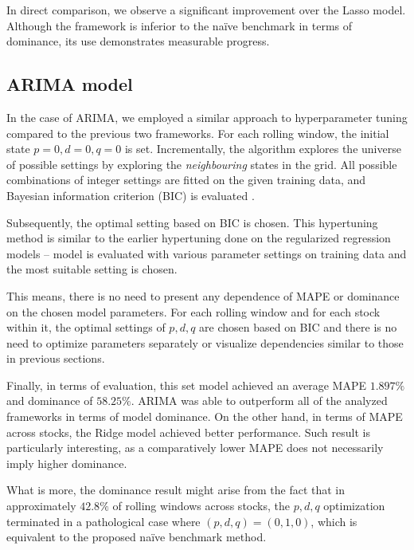 \documentclass{svk_en}
\begin{document}
In direct comparison, we observe a significant improvement over the Lasso model. Although the
framework is inferior to the naïve benchmark in terms of dominance, its use demonstrates measurable progress.

\subsection{ARIMA model}
In the case of ARIMA, we employed a similar approach to hyperparameter tuning compared to the previous two frameworks.
For each rolling window, the initial state $p = 0, d = 0, q = 0$ is set. Incrementally, the algorithm
explores the universe of possible settings by exploring the \textit{neighbouring} states in the grid. All possible combinations
of integer settings are fitted on the given training data, and Bayesian information criterion (BIC) is evaluated \cite{pmdarima}.


Subsequently, the optimal setting based on BIC is chosen. This hypertuning method is similar to the earlier hypertuning done on the regularized
regression models -- model is evaluated with various parameter settings on training data and the most suitable setting is chosen.

This means, there is no need to present any dependence of MAPE or dominance
on the chosen model parameters. For each rolling window and for each stock within
it, the optimal settings of $p, d, q$ are chosen based on BIC and there is no need to optimize
parameters separately or visualize dependencies similar to those in previous
sections.

Finally, in terms of evaluation, this set model achieved an average MAPE $\mathbf{1.897 \%}$ and dominance of $\mathbf{58.25 \%}$.
ARIMA was able to outperform all of the analyzed frameworks in terms of model dominance. On the other hand, in terms of MAPE across stocks,
the Ridge model achieved better performance. Such result is particularly interesting, as a comparatively
lower MAPE does not necessarily imply higher dominance.

What is more, the dominance result might arise from the fact that in
approximately $42.8 \%$ of rolling windows across stocks, the $p, d, q$ optimization terminated in a
pathological case where $(p,d,q) = (0,1,0)$, which is equivalent to the proposed naïve
benchmark method.
\end{document}
